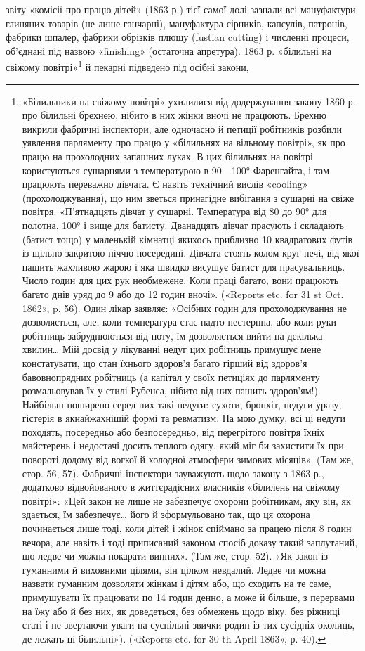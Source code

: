 \parcont{}  %
звіту «комісії про працю дітей» (1863 р.) тієї самої долі зазнали
всі мануфактури глиняних товарів (не лише ганчарні), мануфактура
сірників, капсулів, патронів, фабрики шпалер, фабрики
обрізків плюшу (fustian cutting) і численні процеси, об’єднані
під назвою «finishing» (остаточна апретура). 1863 р. «білильні
на свіжому повітрі»\footnote{
«Білильники на свіжому повітрі» ухилилися від додержування
закону 1860 р. про білильні брехнею, нібито в них жінки вночі не працюють.
Брехню викрили фабричні інспектори, але одночасно й петиції
робітників розбили уявлення парляменту про працю у «білильнях на
вільному повітрі», як про працю на прохолодних запашних луках. В цих
білильнях на повітрі користуються сушарнями з температурою в 90—100°
Фаренгайта, і там працюють переважно дівчата. Є навіть технічний вислів
«cooling» (прохолоджування), що ним зветься принагідне вибігання з
сушарні на свіже повітря. «П’ятнадцять дівчат у сушарні. Температура
від 80 до 90° для полотна, 100° і вище для батисту. Дванадцять дівчат прасують
і складають (батист тощо) у маленькій кімнатці якихось приблизно
10 квадратових футів із щільно закритою піччю посередині. Дівчата стоять
колом круг печі, від якої пашить жахливою жарою і яка швидко висушує
батист для прасувальниць. Число годин для цих рук необмежене. Коли
праці багато, вони працюють багато днів уряд до 9 або до 12 годин вночі».
(«Reports etc. for 31 st Oct. 1862», p. 56). Один лікар заявляє: «Осібних
годин для прохолоджування не дозволяється, але, коли температура стає
надто нестерпна, або коли руки робітниць забруднюються від поту, їм
дозволяється вийти на декілька хвилин\dots{} Мій досвід у лікуванні недуг
цих робітниць примушує мене констатувати, що стан їхнього здоров'я
багато гірший від здоров’я бавовнопрядних робітниць (а капітал у своїх
петиціях до парляменту розмальовував їх у стилі Рубенса, нібито від них
пашить здоров’ям!). Найбільш поширено серед них такі недуги: сухоти,
бронхіт, недуги уразу, гістерія в якнайжахнішій формі та ревматизм.
На мою думку, всі ці недуги походять, посередньо або безпосередньо,
від перегрітого повітря їхніх майстерень і недостачі досить теплого одягу,
який міг би захистити їх при повороті додому від вогкої й холодної атмосфери
зимових місяців». (Там же, стор. 56, 57). Фабричні інспектори зауважують
щодо закону з 1863 р., додатково відвойованого в життєрадісних
власників «білилень на свіжому повітрі»: «Цей закон не лише не забезпечує
охорони робітникам, яку він, як здається, їм забезпечує\dots{} його й
зформульовано так, що ця охорона починається лише тоді, коли дітей
і жінок спіймано за працею після 8 годин вечора, але навіть і тоді приписаний
законом спосіб доказу такий заплутаний, що ледве чи можна
покарати винних». (Там же, стор. 52). «Як закон із гуманними й виховними
цілями, він цілком невдалий. Ледве чи можна назвати гуманним
дозволяти жінкам і дітям або, що сходить на те саме, примушувати їх
працювати по 14 годин денно, а може й більше, з перервами на їжу або
й без них, як доведеться, без обмежень щодо віку, без ріжниці статі
і не звертаючи уваги на суспільні звички родин із тих сусідніх околиць,
де лежать ці білильні»). («Reports etc. for 30 th April 1863», р. 40).
} й пекарні підведено під осібні закони,
